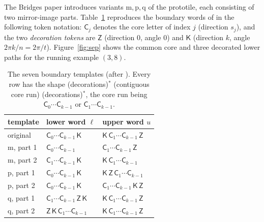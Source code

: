 \documentclass[11pt]{article}
\theoremstyle{remark}
\theoremstyle{definition}
\newcommand{\core}{\mathsf{C}}
\newcommand{\Zt}{\mathsf{Z}}
\newcommand{\Kt}{\mathsf{K}}
\begin{document}
The Bridges paper \cite{Imura2026} introduces variants $\mathrm{m},\mathrm{p},\mathrm{q}$
of the prototile, each consisting of two mirror-image parts. Table~\ref{tab:templates}
reproduces the boundary words of \cite[Table~1]{Imura2026} in the following token
notation: $\core_j$ denotes the core letter of index $j$ (direction $s_j$), and the two
\emph{decoration tokens} are $\Zt$ (direction $0$, angle $0$) and $\Kt$ (direction $k$,
angle $2\pi k/n = 2\pi/t$). Figure~\ref{fig:sep} shows the common core and three
decorated lower paths for the running example $(3,8)$.

\begin{table}[ht]
\centering
\small
\begin{tabular}{lll}
\toprule
template & lower word $\ell$ & upper word $u$\\
\midrule
original & $\core_0\cdots \core_{k-1}\,\Kt$ & $\Kt\,\core_1\cdots \core_{k-1}\,\Zt$\\
$\mathrm{m}$, part 1 & $\core_0\cdots \core_{k-1}$ & $\core_1\cdots \core_{k-1}\,\Zt$\\
$\mathrm{m}$, part 2 & $\core_1\cdots \core_{k-1}\,\Kt$ & $\Kt\,\core_1\cdots \core_{k-1}$\\
$\mathrm{p}$, part 1 & $\core_0\cdots \core_{k-1}\,\Kt$ & $\Kt\,\Zt\,\core_1\cdots \core_{k-1}$\\
$\mathrm{p}$, part 2 & $\core_0\cdots \core_{k-1}\,\Kt$ & $\core_1\cdots \core_{k-1}\,\Kt\,\Zt$\\
$\mathrm{q}$, part 1 & $\core_1\cdots \core_{k-1}\,\Zt\,\Kt$ & $\Kt\,\core_1\cdots \core_{k-1}\,\Zt$\\
$\mathrm{q}$, part 2 & $\Zt\,\Kt\,\core_1\cdots \core_{k-1}$ & $\Kt\,\core_1\cdots \core_{k-1}\,\Zt$\\
\bottomrule
\end{tabular}
\caption{The seven boundary templates (after \cite[Table~1]{Imura2026}).
Every row has the shape (decorations)$^*$ (contiguous core run) (decorations)$^*$,
the core run being $\core_0\cdots\core_{k-1}$ or $\core_1\cdots\core_{k-1}$.}
\label{tab:templates}
\end{table}
\end{document}
